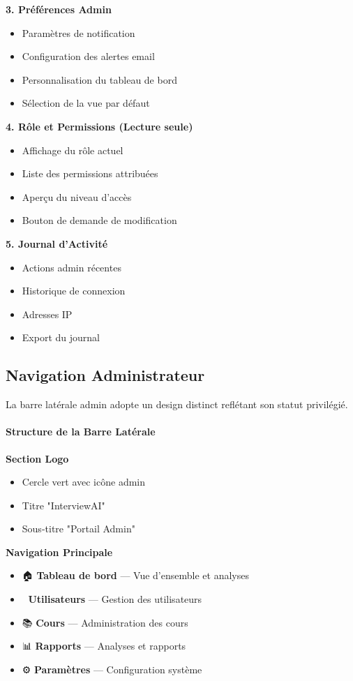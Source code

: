 \documentclass[12pt, a4paper]{report}
\begin{document}
\textbf{3. Préférences Admin}
\begin{itemize}
    \item Paramètres de notification
    \item Configuration des alertes email
    \item Personnalisation du tableau de bord
    \item Sélection de la vue par défaut
\end{itemize}

\textbf{4. Rôle et Permissions (Lecture seule)}
\begin{itemize}
    \item Affichage du rôle actuel
    \item Liste des permissions attribuées
    \item Aperçu du niveau d'accès
    \item Bouton de demande de modification
\end{itemize}

\textbf{5. Journal d'Activité}
\begin{itemize}
    \item Actions admin récentes
    \item Historique de connexion
    \item Adresses IP
    \item Export du journal
\end{itemize}

\subsection{Navigation Administrateur}

La barre latérale admin adopte un design distinct reflétant son statut privilégié.

\paragraph{Structure de la Barre Latérale}

\textbf{Section Logo}
\begin{itemize}
    \item Cercle vert avec icône admin
    \item Titre "InterviewAI"
    \item Sous-titre "Portail Admin"
\end{itemize}

\textbf{Navigation Principale}
\begin{itemize}
    \item 🏠 \textbf{Tableau de bord} --- Vue d'ensemble et analyses
    \item 👥 \textbf{Utilisateurs} --- Gestion des utilisateurs
    \item 📚 \textbf{Cours} --- Administration des cours
    \item 📊 \textbf{Rapports} --- Analyses et rapports
    \item ⚙️ \textbf{Paramètres} --- Configuration système
\end{itemize}
\end{document}
